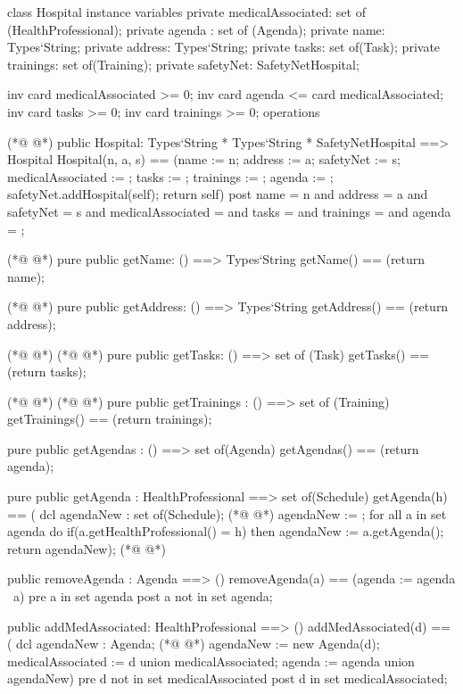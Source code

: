 \begin{vdmpp}[breaklines=true]
class Hospital
instance variables
  private medicalAssociated: set of (HealthProfessional);
  private agenda : set of (Agenda);
  private name: Types`String;
  private address: Types`String;
  private tasks: set of(Task);
  private trainings: set of(Training);
  private safetyNet: SafetyNetHospital;
 
 inv card medicalAssociated >= 0;
 inv card agenda <= card medicalAssociated;
 inv card tasks >= 0;
 inv card trainings >= 0;
operations

(*@
\label{Hospital:17}
@*)
 public Hospital: Types`String * Types`String * SafetyNetHospital ==> Hospital
  Hospital(n, a, s) == (name := n; address := a; safetyNet := s; medicalAssociated := {}; tasks := {}; trainings := {}; agenda := {};
  safetyNet.addHospital(self); return self)
 post name = n and address = a and safetyNet = s and medicalAssociated = {} and tasks = {} and trainings = {} and agenda = {};
 
(*@
\label{getName:22}
@*)
 pure public getName: () ==> Types`String
  getName() == (return name);
 
(*@
\label{getAddress:25}
@*)
 pure public getAddress: () ==> Types`String
  getAddress() == (return address);
  
(*@
\label{getAgendas:28}
@*)
(*@
\label{getTasks:28}
@*)
 pure public getTasks: () ==> set of (Task)
  getTasks() == (return tasks);
 
(*@
\label{getTrainings:31}
@*)
(*@
\label{getAgenda:31}
@*)
 pure public getTrainings : () ==> set of (Training)
  getTrainings() == (return trainings);
 
 pure public getAgendas : () ==> set of(Agenda)
  getAgendas() == (return agenda);
  
 pure public getAgenda : HealthProfessional ==> set of(Schedule)
  getAgenda(h) == (
   dcl agendaNew : set of(Schedule);
(*@
\label{removeAgenda:40}
@*)
   agendaNew := {};
   for all a in set agenda do
    if(a.getHealthProfessional() = h)
     then agendaNew := a.getAgenda();
   return agendaNew);
(*@
\label{addMedAssociated:45}
@*)
 
 public removeAgenda : Agenda ==> ()
  removeAgenda(a) == (agenda := agenda \ {a})
 pre a in set agenda
 post a not in set agenda;
 
 public addMedAssociated: HealthProfessional ==> ()
  addMedAssociated(d) == (
   dcl agendaNew : Agenda;
(*@
\label{removeMedAssociated:54}
@*)
   agendaNew := new Agenda(d);
   medicalAssociated := {d} union medicalAssociated;
   agenda := agenda union {agendaNew})
 pre d not in set medicalAssociated
 post d in set medicalAssociated;
  

\end{vdmpp}
